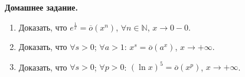 \documentclass[12pt]{article}
\begin{document}
	\begin{center}
		\textbf{\Large{Домашнее задание.}}
	\end{center}
	\begin{enumerate}
		\item Доказать, что $e^{\frac{1}{x}} = \overline{o}\left(x^n\right)$, $\forall n \in \mathbb{N}$, $x \rightarrow 0 - 0$.
		\item Доказать, что $\forall s > 0$; $\forall a > 1$: $x^s = \overline{o}\left(a^x\right)$, $x \rightarrow + \infty$.
		\item Доказать, что $\forall s > 0$; $\forall p > 0$: $\left(\ln x\right)^5 = \overline{o}\left(x^p\right)$, $x \rightarrow + \infty$.
	\end{enumerate}
\end{document}

